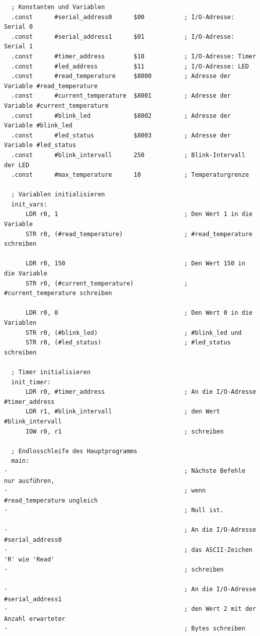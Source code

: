 {
\footnotesize

\begin{verbatim}
  ; Konstanten und Variablen
  .const      #serial_address0      $00           ; I/O-Adresse: Serial 0
  .const      #serial_address1      $01           ; I/O-Adresse: Serial 1
  .const      #timer_address        $10           ; I/O-Adresse: Timer
  .const      #led_address          $11           ; I/O-Adresse: LED
  .const      #read_temperature     $8000         ; Adresse der Variable #read_temperature
  .const      #current_temperature  $8001         ; Adresse der Variable #current_temperature
  .const      #blink_led            $8002         ; Adresse der Variable #blink_led
  .const      #led_status           $8003         ; Adresse der Variable #led_status
  .const      #blink_intervall      250           ; Blink-Intervall der LED
  .const      #max_temperature      10            ; Temperaturgrenze

  ; Variablen initialisieren
  init_vars:
      LDR r0, 1                                   ; Den Wert 1 in die Variable
      STR r0, (#read_temperature)                 ; #read_temperature schreiben

      LDR r0, 150                                 ; Den Wert 150 in die Variable
      STR r0, (#current_temperature)              ; #current_temperature schreiben

      LDR r0, 0                                   ; Den Wert 0 in die Variablen
      STR r0, (#blink_led)                        ; #blink_led und
      STR r0, (#led_status)                       ; #led_status schreiben

  ; Timer initialisieren
  init_timer:
      LDR r0, #timer_address                      ; An die I/O-Adresse #timer_address
      LDR r1, #blink_intervall                    ; den Wert #blink_intervall
      IOW r0, r1                                  ; schreiben

  ; Endlosschleife des Hauptprogramms
  main:
·                                                 ; Nächste Befehle nur ausführen,
·                                                 ; wenn #read_temperature ungleich
·                                                 ; Null ist.

·                                                 ; An die I/O-Adresse #serial_address0
·                                                 ; das ASCII-Zeichen 'R' wie 'Read'
·                                                 ; schreiben

·                                                 ; An die I/O-Adresse #serial_address1
·                                                 ; den Wert 2 mit der Anzahl erwarteter
·                                                 ; Bytes schreiben


\end{verbatim}}
